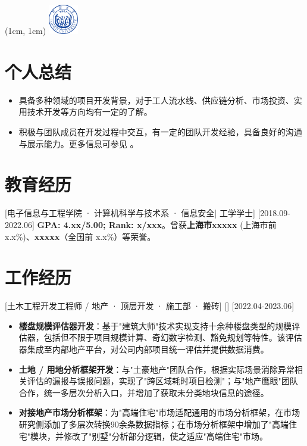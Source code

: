 \documentclass{resume}
\begin{document}
\begin{textblock*}{2cm}(1cm, 1cm)
  {\includegraphics[height=1.3cm]{figure/Tongji_Uni_logo.svg.png}}
\end{textblock*}


\ResumeTitle

\section{个人总结}
\begin{itemize}
  \item 具备多种领域的项目开发背景，对于工人流水线、供应链分析、市场投资、实用技术开发等方向均有一定的了解。
  \item 积极与团队成员在开发过程中交互，有一定的团队开发经验，具备良好的沟通与展示能力。更多信息可参见 。
\end{itemize}

\section{教育经历}
[\textnormal{电子信息与工程学院 · 计算机科学与技术系 · 信息安全|} 工学学士]
[2018.09-2022.06]
\textbf{GPA: 4.xx/5.00; Rank: x/xxx}。曾获\textbf{上海市xxxxx} (上海市前 x.x\%)、\textbf{xxxxx}（全国前 x.x\%）等荣誉。


\section{工作经历}

[土木工程开发工程师 / 地产 · 顶层开发 · 施工部 · 搬砖]
[]
[2022.04-2023.06]
\begin{itemize}
  \item \textbf{楼盘规模评估器开发}：基于"建筑大师"技术实现支持十余种楼盘类型的规模评估器，包括但不限于项目规模计算、奇幻数字检测、豁免规划等特性。该评估器集成至内部地产平台，对公司内部项目统一评估并提供数据消费。
  \item \textbf{土地 / 用地分析框架开发}：与"土豪地产"团队合作，根据实际场景消除异常相关评估的漏报与误报问题，实现了"跨区域耗时项目检测"；与"地产鹰眼"团队合作，统一多层次分析入口，并增加了获取未分类地块信息的途径。
  \item \textbf{对接地产市场分析框架}：为"高端住宅"市场适配通用的市场分析框架，在市场研究侧添加了多层次转换90余条数据指标；在市场分析框架中增加了"高端住宅"模块，并修改了"别墅"分析部分逻辑，使之适应"高端住宅"市场。
\end{itemize}
\end{document}
